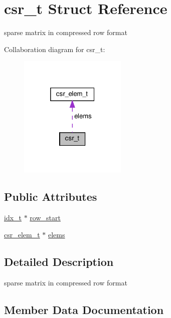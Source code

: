\hypertarget{structcsr__t}{}\section{csr\+\_\+t Struct Reference}
\label{structcsr__t}


sparse matrix in compressed row format  




Collaboration diagram for csr\+\_\+t\+:\nopagebreak
\begin{figure}[H]
\begin{center}
\leavevmode
\includegraphics[width=145pt]{structcsr__t__coll__graph}
\end{center}
\end{figure}
\subsection*{Public Attributes}
\begin{DoxyCompactItemize}
\item 
\hyperlink{spmv_8cc_a8e93478a00e685bea5e6a3f617bf03a3}{idx\+\_\+t} $\ast$ \hyperlink{structcsr__t_ac52d7a1ff3a054e2b8c7fcc706e525b6}{row\+\_\+start}
\item 
\hyperlink{structcsr__elem__t}{csr\+\_\+elem\+\_\+t} $\ast$ \hyperlink{structcsr__t_a8fda532ad93e6820aad02feac6bbe04b}{elems}
\end{DoxyCompactItemize}


\subsection{Detailed Description}
sparse matrix in compressed row format 

\subsection{Member Data Documentation}
\mbox{\label{structcsr__t_a8fda532ad93e6820aad02feac6bbe04b}} 
